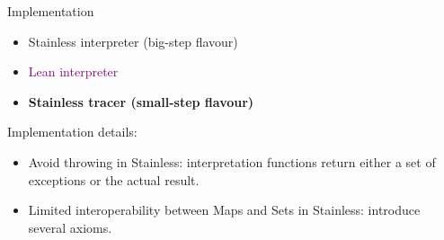 \documentclass{EESD}
\begin{document}
\begin{frame}{Implementation}
    \begin{itemize}
        \item Stainless interpreter (big-step flavour)
              \vspace{0.2cm}
        \item \textcolor{purple}{Lean interpreter}
              \vspace{0.2cm}
        \item \textbf{Stainless tracer (small-step flavour)}
    \end{itemize}



    \vspace{1cm}
    \noindent\hrulefill
    \vspace{0.5cm}

    Implementation details:
    \begin{itemize}
        \item Avoid throwing in Stainless: interpretation functions return either a set of exceptions or the actual result.   %
        \item Limited interoperability between Maps and Sets in Stainless: introduce several axioms. %
    \end{itemize}

\end{frame}
\end{document}

